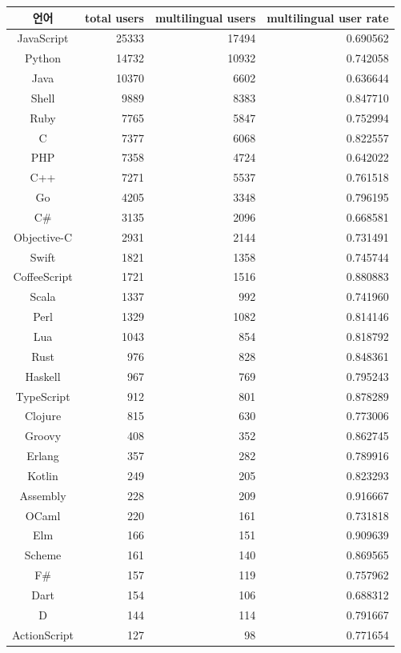 \documentclass[10pt, a4paper, titlepage]{article}
\begin{document}
\begin{longtable}{|c|r|r|r|}
\hline
\rowcolor[gray]{0.8}
언어 & total users & multilingual users & multilingual user rate \\
 \hline
 JavaScript & 25333 & 17494 & 0.690562 \\
 \hline
 Python & 14732 & 10932 & 0.742058 \\
 \hline
 Java & 10370 & 6602 & 0.636644 \\
 \hline
 Shell & 9889 & 8383 & 0.847710 \\
 \hline
 Ruby & 7765 & 5847 & 0.752994 \\
 \hline
 C & 7377 & 6068 & 0.822557 \\
 \hline
 PHP & 7358 & 4724 & 0.642022 \\
 \hline
 C++ & 7271 & 5537 & 0.761518 \\
 \hline
 Go & 4205 & 3348 & 0.796195 \\
 \hline
 C\# & 3135 & 2096 & 0.668581 \\
 \hline
 Objective-C & 2931 & 2144 & 0.731491 \\
 \hline
 Swift & 1821 & 1358 & 0.745744 \\
 \hline
 CoffeeScript & 1721 & 1516 & 0.880883 \\
 \hline
 Scala & 1337 & 992 & 0.741960 \\
 \hline
 Perl & 1329 & 1082 & 0.814146 \\
 \hline
 Lua & 1043 & 854 & 0.818792 \\
 \hline
 Rust & 976 & 828 & 0.848361 \\
 \hline
 Haskell & 967 & 769 & 0.795243 \\
 \hline
 TypeScript & 912 & 801 & 0.878289 \\
 \hline
 Clojure & 815 & 630 & 0.773006 \\
 \hline
 Groovy & 408 & 352 & 0.862745 \\
 \hline
 Erlang & 357 & 282 & 0.789916 \\
 \hline
 Kotlin & 249 & 205 & 0.823293 \\
 \hline
 Assembly & 228 & 209 & 0.916667 \\
 \hline
 OCaml & 220 & 161 & 0.731818 \\
 \hline
 Elm & 166 & 151 & 0.909639 \\
 \hline
 Scheme & 161 & 140 & 0.869565 \\
 \hline
 F\# & 157 & 119 & 0.757962 \\
 \hline
 Dart & 154 & 106 & 0.688312 \\
 \hline
 D & 144 & 114 & 0.791667 \\
 \hline
 ActionScript & 127 & 98 & 0.771654 \\
 \hline
\end{longtable}
\end{document}

